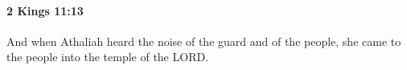 
		\paragraph{2 Kings 11:13} %
			\label{2KINGS-11-13}

			And when Athaliah heard the noise of the guard and of the people, she came to the people into the temple of the LORD.


